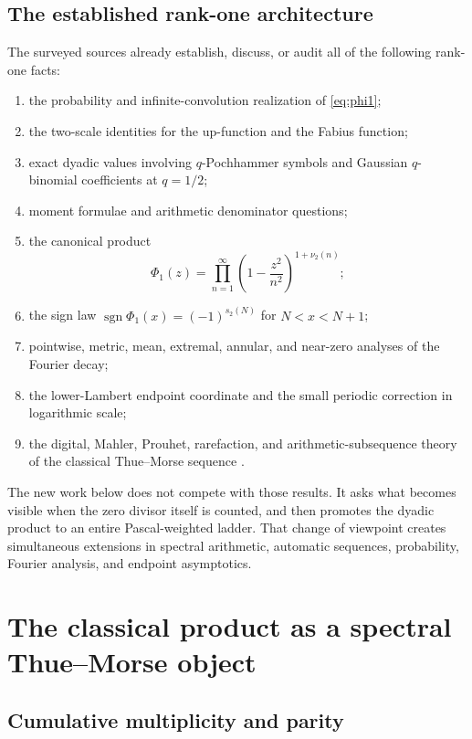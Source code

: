 \documentclass[11pt,a4paper]{article}
\theoremstyle{frontier}
\theoremstyle{definition}
\newcommand{\sgn}{\operatorname{sgn}}
\begin{document}
\subsection{The established rank-one architecture}

The surveyed sources \cite{repo-primary,repo-frontiers,arias1982,arias2018} already establish, discuss, or audit all of the following rank-one facts:
\begin{enumerate}[label=(\alph*)]
\item the probability and infinite-convolution realization of \eqref{eq:phi1};
\item the two-scale identities for the up-function and the Fabius function;
\item exact dyadic values involving $q$-Pochhammer symbols and Gaussian $q$-binomial coefficients at $q=1/2$;
\item moment formulae and arithmetic denominator questions;
\item the canonical product
\[
  \Phi_1(z)=\prod_{n=1}^{\infty}\left(1-\frac{z^2}{n^2}\right)^{1+\nu_2(n)};
\]
\item the sign law $\sgn\Phi_1(x)=(-1)^{s_2(N)}$ for $N<x<N+1$;
\item pointwise, metric, mean, extremal, annular, and near-zero analyses of the Fourier decay;
\item the lower-Lambert endpoint coordinate and the small periodic correction in logarithmic scale;
\item the digital, Mahler, Prouhet, rarefaction, and arithmetic-subsequence theory of the classical Thue--Morse sequence \cite{allouche-shallit-1999,automatic-sequences,toth2022}.
\end{enumerate}

The new work below does not compete with those results.  It asks what becomes visible when the zero divisor itself is counted, and then promotes the dyadic product to an entire Pascal-weighted ladder.  That change of viewpoint creates simultaneous extensions in spectral arithmetic, automatic sequences, probability, Fourier analysis, and endpoint asymptotics.

\section{The classical product as a spectral Thue--Morse object}\label{sec:classical-spectral}

\subsection{Cumulative multiplicity and parity}
\end{document}
